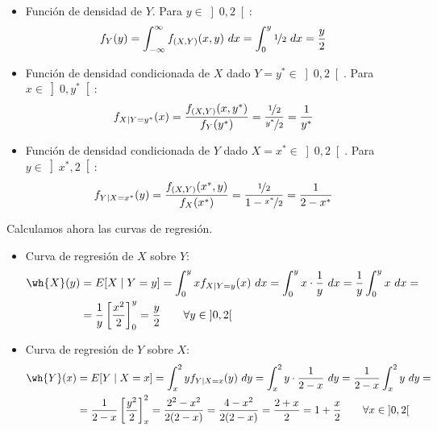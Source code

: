 \begin{ejercicio}
\begin{enumerate}
\begin{itemize}
            \item Función de densidad de $Y$. Para $y\in \left]0,2\right[$:
            \begin{align*}
                f_Y(y) &= \int_{-\infty}^{\infty} f_{(X,Y)}(x, y) \ dx
                = \int_{0}^{y} \nicefrac{1}{2} \ dx = \frac{y}{2}
            \end{align*}

            \item Función de densidad condicionada de $X$ dado $Y=y^*\in \left]0,2\right[$. Para $x\in \left]0,y^*\right[$:
            \begin{align*}
                f_{X\mid Y=y^*}(x) &= \dfrac{f_{(X,Y)}(x, y^*)}{f_Y(y^*)}
                = \dfrac{\nicefrac{1}{2}}{\nicefrac{y^*}{2}}
                = \dfrac{1}{y^*}
            \end{align*}

            \item Función de densidad condicionada de $Y$ dado $X=x^*\in \left]0,2\right[$. Para $y\in \left]x^*,2\right[$:
            \begin{align*}
                f_{Y\mid X=x^*}(y) &= \dfrac{f_{(X,Y)}(x^*, y)}{f_X(x^*)}
                = \dfrac{\nicefrac{1}{2}}{1-\nicefrac{x^*}{2}}
                = \dfrac{1}{2-x^*}
            \end{align*}
        \end{itemize}

        Calculamos ahora las curvas de regresión.
        \begin{itemize}
            \item Curva de regresión de $X$ sobre $Y$:
            \begin{align*}
                \wh{X}(y) &= E[X\mid Y = y] = \int_{0}^{y} x f_{X\mid Y=y}(x) \ dx
                = \int_{0}^{y} x\cdot  \dfrac{1}{y} \ dx
                = \dfrac{1}{y} \int_{0}^{y} x \ dx
                =\\&= \dfrac{1}{y} \left[\dfrac{x^2}{2}\right]_{0}^{y}
                = \dfrac{y}{2} \qquad \forall y\in \left]0,2\right[
            \end{align*}

            \item Curva de regresión de $Y$ sobre $X$:
            \begin{align*}
                \wh{Y}(x) &= E[Y\mid X = x] = \int_{x}^{2} y f_{Y\mid X=x}(y) \ dy
                = \int_{x}^{2} y\cdot  \dfrac{1}{2-x} \ dy
                = \dfrac{1}{2-x} \int_{x}^{2} y \ dy
                =\\&= \dfrac{1}{2-x} \left[\dfrac{y^2}{2}\right]_{x}^{2}
                = \dfrac{2^2 - x^2}{2(2-x)}
                = \dfrac{4-x^2}{2(2-x)}
                = \dfrac{2+x}{2} = 1 + \dfrac{x}{2} \qquad \forall x\in \left]0,2\right[
            \end{align*}
        \end{itemize}


\end{enumerate}
\end{ejercicio}
